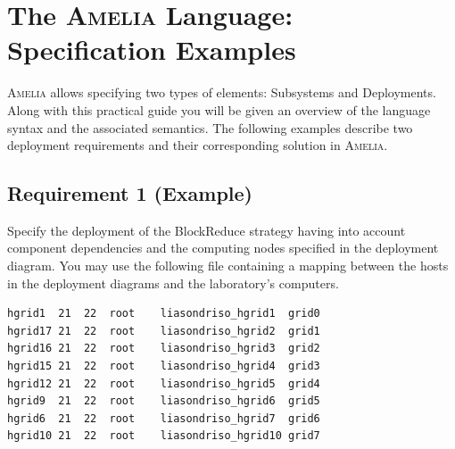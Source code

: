 \documentclass{article}
\newcommand\amelia[0]{\textsc{Amelia}}
\begin{document}

\section{The \amelia{} Language: Specification Examples}

\amelia{} allows specifying two types of elements: Subsystems and Deployments. Along with this
practical guide you will be given an overview of the language syntax and the associated semantics. The following examples describe two deployment requirements and their corresponding solution in \amelia{}.

\subsection{Requirement 1 (Example)}
\label{subsect:apx-amelia-example-1}

Specify the deployment of the BlockReduce strategy having into account component dependencies and the computing nodes specified in the deployment diagram. You may use the following file containing a mapping between the hosts in the deployment diagrams and the laboratory's computers. 

\begin{lstlisting}[style=common,caption=hosts.txt]
hgrid1	21	22	root	liasondriso_hgrid1	grid0
hgrid17	21	22	root	liasondriso_hgrid2	grid1
hgrid16	21	22	root	liasondriso_hgrid3	grid2
hgrid15	21	22	root	liasondriso_hgrid4	grid3
hgrid12	21	22	root	liasondriso_hgrid5	grid4
hgrid9	21	22	root	liasondriso_hgrid6	grid5
hgrid6	21	22	root	liasondriso_hgrid7	grid6
hgrid10	21	22	root	liasondriso_hgrid10	grid7
\end{lstlisting}
\end{document}
